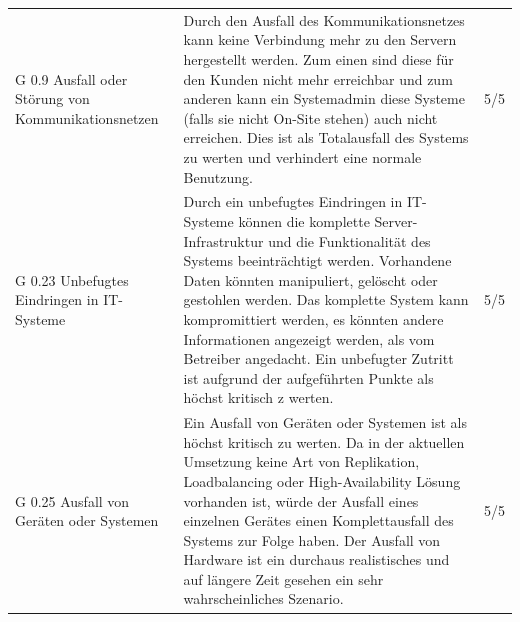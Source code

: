 \documentclass[a4paper,
    11pt,
    headings=small,
    ngerman,
    listof=totoc,
    numbers=noenddot]{scrreprt}[2021/11/13]
\begin{document}
\begin{longtable}{p{}p{}l}
  G 0.9 Ausfall oder Störung von Kommunikationsnetzen                                                                                                                                                             & Durch den Ausfall des Kommunikationsnetzes kann keine Verbindung mehr zu den Servern hergestellt werden. Zum einen sind diese für den Kunden nicht mehr erreichbar und zum anderen kann ein Systemadmin diese Systeme (falls sie nicht On-Site stehen) auch nicht erreichen. Dies ist als Totalausfall des Systems zu werten und verhindert eine normale Benutzung.                                                                                                                                                                                                                                                                                               & 5/5         \\
  G 0.23 Unbefugtes Eindringen in IT-Systeme                                                                                                                                                                      & Durch ein unbefugtes Eindringen in IT-Systeme können die komplette Server-Infrastruktur und die Funktionalität des Systems beeinträchtigt werden. Vorhandene Daten könnten manipuliert, gelöscht oder gestohlen werden. Das komplette System kann kompromittiert werden, es könnten andere Informationen angezeigt werden, als vom Betreiber angedacht. Ein unbefugter Zutritt ist aufgrund der aufgeführten Punkte als höchst kritisch z werten.                                                                                                                                                                                                                 & 5/5         \\
  G 0.25 Ausfall von Geräten oder Systemen                                                                                                                                                                        & Ein Ausfall von Geräten oder Systemen ist als höchst kritisch zu werten. Da in der aktuellen Umsetzung keine Art von Replikation, Loadbalancing oder High-Availability Lösung vorhanden ist, würde der Ausfall eines einzelnen Gerätes einen Komplettausfall des Systems zur Folge haben. Der Ausfall von Hardware ist ein durchaus realistisches und auf längere Zeit gesehen ein sehr wahrscheinliches Szenario.                                                                                                                                                                                                                                                & 5/5         \\

\end{longtable}
\end{document}
